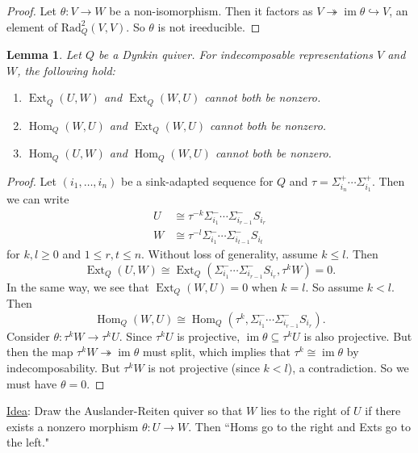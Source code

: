 \documentclass{book}
\newtheorem{lemma}[theorem]{Lemma}
\DeclareMathOperator{\Hom}{Hom}
\DeclareMathOperator{\im}{im}
\DeclareMathOperator{\Ext}{Ext}
\begin{document}
    \begin{proof}
        Let $\theta:V\to W$ be a non-isomorphism. Then it factors as $V\twoheadrightarrow \im\theta \hookrightarrow V$, an element of $\text{Rad}^2_Q(V,V)$. So $\theta$ is not ireeducible.
    \end{proof}
    
    \begin{lemma}
        Let $Q$ be a Dynkin quiver. For indecomposable representations $V$ and $W$, the following hold:
        \begin{enumerate}
            \item $\Ext_Q(U,W)$ and $\Ext_Q(W,U)$ cannot both be nonzero.
            \item $\Hom_Q(W,U)$ and $\Ext_Q(W,U)$ cannot both be nonzero.
            \item $\Hom_Q(U,W)$ and $\Hom_Q(W,U)$ cannot both be nonzero.
        \end{enumerate}
    \end{lemma}
    
    \begin{proof}
        Let $(i_1,\ldots,i_n)$ be a sink-adapted sequence for $Q$ and $\tau=\Sigma_{i_n}^+\cdots \Sigma_{i_1}^+$. Then we can write 
        \begin{align*}
            U&\cong \tau^{-k}\Sigma_{i_1}^-\cdots\Sigma_{i_{r-1}}^-S_{i_r}\\
            W&\cong\tau^{-l}\Sigma_{i_1}^-\cdots\Sigma_{i_{t-1}}^-S_{i_t}
        \end{align*}
        for $k,l\geq 0$ and $1\leq r,t\leq n$. Without loss of generality, assume $k\leq l$. Then \[\Ext_Q(U,W)\cong\Ext_Q(\Sigma_{i_1}^-\cdots\Sigma_{i_{r-1}}^-S_{i_r},\tau^k W)=0.\] In the same way, we see that $\Ext_Q(W,U)=0$ when $k=l$. So assume $k<l$. Then \[\Hom_Q(W,U)\cong\Hom_Q(\tau^k,\Sigma_{i_1}^-\cdots\Sigma_{i_{r-1}}^-S_{i_r}).\] Consider $\theta:\tau^kW\to\tau^kU$. Since $\tau^kU$ is projective, $\im\theta\subseteq\tau^kU$ is also projective. But then the map $\tau^kW\twoheadrightarrow\im\theta$ must split, which implies that $\tau^k\cong\im\theta$ by indecomposability. But $\tau^kW$ is not projective (since $k<l$), a contradiction. So we must have $\theta=0$.
    \end{proof}
    
    \underline{Idea}: Draw the Auslander-Reiten quiver so that $W$ lies to the right of $U$ if there exists a nonzero morphism $\theta:U\to W$. Then ``Homs go to the right and Exts go to the left."
    
\end{document}
